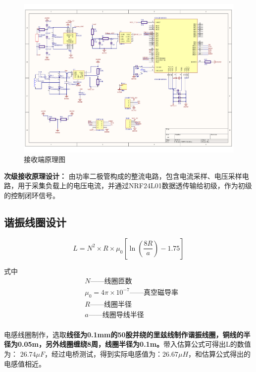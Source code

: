 ﻿\documentclass[UTF-8,a4paper,12pt]{ctexart}
\begin{document}
            \begin{figure}[H]
              \centering
              \includegraphics[width=12cm]{WPT-2.pdf}
              \caption{接收端原理图}
              \label{接收端原理图}
            \end{figure}
            {\bf{次级接收原理设计：}}
                由功率二极管构成的整流电路，包含电流采样、电压采样电路，用于采集负载上的电压电流，并通过NRF24L01数据透传输给初级，作为初级的控制闭环信号。


            


    \subsection{谐振线圈设计}
            \begin{equation}
            L=N^2\times R \times \mu_0\left[\ln(\frac{8R}{a})-1.75\right]
            \label{L}
            \end{equation}

            式中\[\begin{split}
            &N\text{——线圈匝数} \\
            &\mu_0=4\pi \times 10^{-7}\text{——真空磁导率} \\
            &R\text{——线圈半径} \\
            &a\text{——线圈导线半径} \\
            \end{split}\]

            电感线圈制作，选取{\bf{线径为0.1mm的50股并绕的里兹线制作谐振线圈，铜线的半径为0.05m，另外线圈缠绕8周，线圈半径为0.1m。}}带入估算公式可得出L的数值为： $26.74\mu F$，经过电桥测试，得到实际电感值为：$26.67\mu H$，和估算公式得出的电感值相近。
\end{document}
